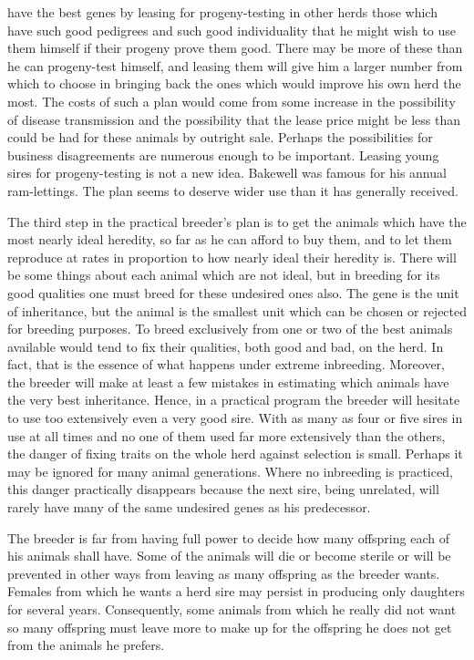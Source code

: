 have the best genes by leasing for progeny-testing in other herds those
which have such good pedigrees and such good individuality that he
might wish to use them himself if their progeny prove them good.
There may be more of these than he can progeny-test himself, and leasing
them will give him a larger number from which to choose in bringing
back the ones which would improve his own herd the most. The
costs of such a plan would come from some increase in the possibility of
disease transmission and the possibility that the lease price might be less
than could be had for these animals by outright sale. Perhaps the possibilities
for business disagreements are numerous enough to be important.
Leasing young sires for progeny-testing is not a new idea. Bakewell
was famous for his annual ram-lettings. The plan seems to deserve
wider use than it has generally received.

The third step in the practical breeder's plan is to get the animals
which have the most nearly ideal heredity, so far as he can afford to buy
them, and to let them reproduce at rates in proportion to how nearly
ideal their heredity is. There will be some things about each animal
which are not ideal, but in breeding for its good qualities one must
breed for these undesired ones also. The gene is the unit of inheritance,
but the animal is the smallest unit which can be chosen or rejected for
breeding purposes. To breed exclusively from one or two of the best
animals available would tend to fix their qualities, both good and bad,
on the herd. In fact, that is the essence of what happens under extreme
inbreeding. Moreover, the breeder will make at least a few mistakes in
estimating which animals have the very best inheritance. Hence, in a
practical program the breeder will hesitate to use too extensively even a
very good sire. With as many as four or five sires in use at all times and
no one of them used far more extensively than the others, the danger of
fixing traits on the whole herd against selection is small. Perhaps it may
be ignored for many animal generations. Where no inbreeding is practiced,
this danger practically disappears because the next sire, being
unrelated, will rarely have many of the same undesired genes as his
predecessor.

The breeder is far from having full power to decide how many offspring
each of his animals shall have. Some of the animals will die or
become sterile or will be prevented in other ways from leaving as many
offspring as the breeder wants. Females from which he wants a herd
sire may persist in producing only daughters for several years. Consequently,
some animals from which he really did not want so many offspring
must leave more to make up for the offspring he does not get
from the animals he prefers.


